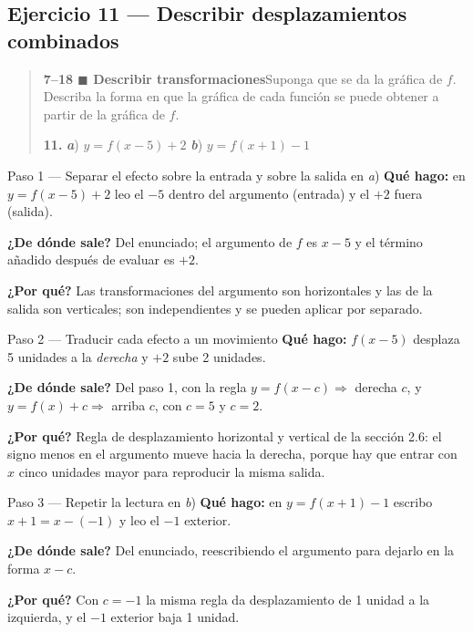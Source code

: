 \documentclass[11pt]{article}
\begin{document}
\subsection*{Ejercicio 11 — Describir desplazamientos combinados}

\begin{quote}
\textbf{7--18 $\blacksquare$ Describir transformaciones}\quad Suponga que se da la gráfica de $f$. Describa la forma en que la gráfica de cada función se puede obtener a partir de la gráfica de $f$.

\textbf{11.} \textbf{\textit{a}}) $y=f(x-5)+2$ \hfill \textbf{\textit{b}}) $y=f(x+1)-1$
\end{quote}

\begin{paso}{Paso 1 --- Separar el efecto sobre la entrada y sobre la salida en \textit{a})}
\textbf{Qué hago:} en $y=f(x-5)+2$ leo el $-5$ dentro del argumento (entrada) y el $+2$ fuera (salida).

\textbf{¿De dónde sale?} Del enunciado; el argumento de $f$ es $x-5$ y el término añadido después de evaluar es $+2$.

\textbf{¿Por qué?} Las transformaciones del argumento son horizontales y las de la salida son verticales; son independientes y se pueden aplicar por separado.
\end{paso}

\begin{paso}{Paso 2 --- Traducir cada efecto a un movimiento}
\textbf{Qué hago:} $f(x-5)$ desplaza 5 unidades a la \emph{derecha} y $+2$ sube 2 unidades.

\textbf{¿De dónde sale?} Del paso 1, con la regla $y=f(x-c)\Rightarrow$ derecha $c$, y $y=f(x)+c\Rightarrow$ arriba $c$, con $c=5$ y $c=2$.

\textbf{¿Por qué?} Regla de desplazamiento horizontal y vertical de la sección 2.6: el signo menos en el argumento mueve hacia la derecha, porque hay que entrar con $x$ cinco unidades mayor para reproducir la misma salida.
\end{paso}

\begin{paso}{Paso 3 --- Repetir la lectura en \textit{b})}
\textbf{Qué hago:} en $y=f(x+1)-1$ escribo $x+1=x-(-1)$ y leo el $-1$ exterior.

\textbf{¿De dónde sale?} Del enunciado, reescribiendo el argumento para dejarlo en la forma $x-c$.

\textbf{¿Por qué?} Con $c=-1$ la misma regla da desplazamiento de 1 unidad a la izquierda, y el $-1$ exterior baja 1 unidad.
\end{paso}
\end{document}
